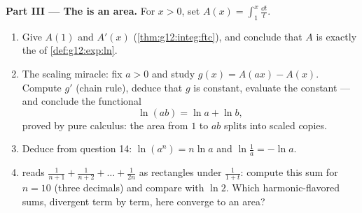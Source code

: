 \begin{problem}
\medskip
\noindent\textbf{Part III --- The  is an area.}
For $x > 0$, set
$A(x) = \displaystyle\int_1^x \frac{\dd t}{t}$.
\begin{enumerate}[resume]
  \item Give $A(1)$ and $A'(x)$
        (\cref{thm:g12:integ:ftc}), and conclude that $A$ is
        exactly the  of
        \cref{def:g12:exp:ln}.
  \item The scaling miracle: fix $a > 0$ and study
        $g(x) = A(ax) - A(x)$. Compute $g'$ (chain rule),
        deduce that $g$ is constant, evaluate the constant ---
        and conclude the functional 
        \[
        \ln(ab) = \ln a + \ln b ,
        \]
        proved by pure calculus: the area from $1$ to $ab$
        splits into scaled copies.
  \item Deduce from question 14: $\ln(a^n) = n\ln a$ and
        $\ln\frac1a = -\ln a$.
  \item {} reads
        $\frac{1}{n+1} + \frac{1}{n+2} + \dots + \frac{1}{2n}$
        as rectangles under $\frac{1}{1 + t}$: compute this sum
        for $n = 10$ (three decimals) and compare with
        $\ln 2$. Which harmonic-flavored sums, divergent term
        by term, here converge to an area?
\end{enumerate}


\end{problem}
